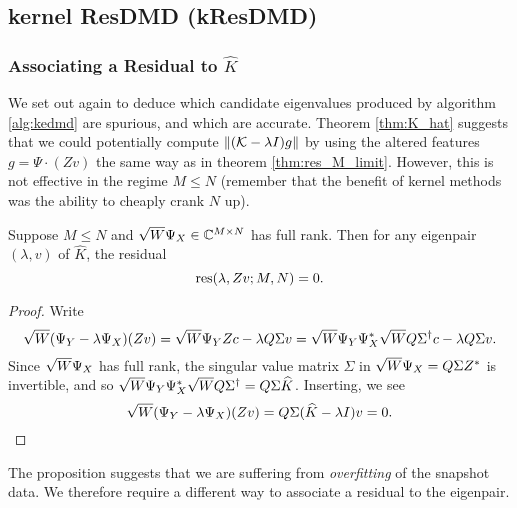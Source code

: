 \subsection{kernel ResDMD (kResDMD)}


\subsubsection{Associating a Residual to $\widehat{K}$}

We set out again to deduce which candidate eigenvalues produced by algorithm 
\ref{alg:kedmd} are spurious, and which are accurate. Theorem \ref{thm:K_hat} suggests 
that we could potentially compute $\| (\mathcal{K} - \lambda I) g \|$ by using the altered 
features $g = \Psi \cdot (Z v)$ the same way as in theorem \ref{thm:res_M_limit}. However, 
this is not effective in the regime $M \leq N$ (remember that the benefit of kernel 
methods was the ability to cheaply crank $N$ up). 

\begin{proposition}
    Suppose $M \leq N$ and $\sqrt{W} \Psi_X \in \mathbb{C}^{M \times N}$ has full rank. Then 
    for any eigenpair $(\lambda, v)$ of $\widehat{K}$, the residual
    \begin{equation}
        \text{res} (\lambda, Z v; M, N) = 0 . 
    \end{equation}
\end{proposition}

\begin{proof}
    Write
    \begin{equation}
        \sqrt{W} (\Psi_Y - \lambda \Psi_X) (Z v) 
        = \sqrt{W} \Psi_Y Z c - \lambda Q \Sigma v
        = \sqrt{W} \Psi_Y \Psi_X^* \sqrt{W} Q \Sigma^\dagger c - \lambda Q \Sigma v . 
    \end{equation}
    Since $\sqrt{W} \Psi_X$ has full rank, the singular value matrix $\Sigma$ in 
    $\sqrt{W} \Psi_X = Q \Sigma Z^*$ is invertible, and so 
    $\sqrt{W} \Psi_Y \Psi_X^* \sqrt{W} Q \Sigma^\dagger = Q \Sigma \widehat{K}$. Inserting, we see 
    \begin{equation}
        \sqrt{W} (\Psi_Y - \lambda \Psi_X) (Z v) = Q \Sigma (\widehat{K} - \lambda I) v = 0 .  
    \end{equation}
\end{proof}

The proposition suggests that we are suffering from \emph{overfitting} of the snapshot 
data. We therefore require a different way to associate a residual to the eigenpair. 

